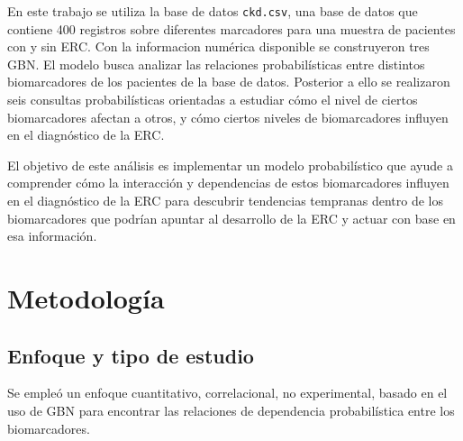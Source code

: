 \documentclass{Academic}
\begin{document}
En este trabajo se utiliza la base de datos \texttt{ckd.csv}, una base de datos que contiene 400 registros sobre 
diferentes marcadores para una muestra de pacientes con y sin ERC. Con la informacion numérica disponible
se construyeron tres GBN. El modelo busca analizar las relaciones probabilísticas entre distintos 
biomarcadores de los pacientes de la base de datos. Posterior a ello se realizaron seis consultas probabilísticas 
orientadas a estudiar cómo el nivel de ciertos biomarcadores afectan a otros, y cómo ciertos niveles
de biomarcadores influyen en el diagnóstico de la ERC.

El objetivo de este análisis es implementar un modelo probabilístico que ayude a comprender cómo
la interacción y dependencias de estos biomarcadores influyen en el diagnóstico de la ERC para 
descubrir tendencias tempranas dentro de los biomarcadores que podrían apuntar 
al desarrollo de la ERC y actuar con base en esa información.

\section{Metodología}

\subsection{Enfoque y tipo de estudio}
Se empleó un enfoque cuantitativo, correlacional, no experimental, basado en el uso de 
GBN para encontrar las relaciones de dependencia probabilística entre los biomarcadores.
\end{document}
